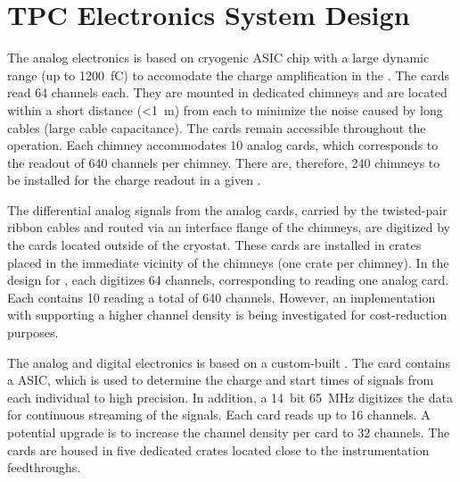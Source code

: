 \section{TPC Electronics System Design}
\label{sec:fddp-tpc-elec-design}


The   analog electronics is based on cryogenic ASIC chip with a large dynamic range (up to \SI{1200}{\femto\coulomb}) to accomodate the charge amplification in the %
. The  cards read \num{64}  channels each. They are mounted in dedicated   chimneys and are located within a short distance (\SI{<1}{\metre}) from each  to minimize the noise caused by long cables (large cable capacitance). The cards remain accessible throughout the  operation. Each  chimney %
accommodates \num{10}  analog cards, which corresponds to the readout of \num{640}  channels per chimney. There are, therefore, \num{240}  chimneys to be installed for the charge readout in a given .   

The differential analog signals from the analog  cards, carried by the twisted-pair ribbon cables and routed via an interface flange of the  chimneys, are digitized by the  cards located %
outside of the cryostat. These cards are %
installed in  crates placed in the immediate vicinity of the  chimneys (one crate per chimney). %
In the design for , each  digitizes \num{64} channels, corresponding to reading one  analog card. Each   contains \num{10}  reading a total of \num{640} channels. However, an implementation with  supporting a higher channel density is being investigated for cost-reduction purposes. 

The   analog and digital electronics is based on a custom-built . The card contains a  ASIC, which is used to determine %
the charge and start times of signals from each individual  to high precision. In addition, a \SI{14}{bit} \SI{65}{MHz}  digitizes the data for continuous streaming of the  signals. Each card reads up to \num{16} channels. A potential %
upgrade is to increase the channel density per card to \num{32} channels. The  cards are housed in five dedicated  crates located close to the  instrumentation feedthroughs.

